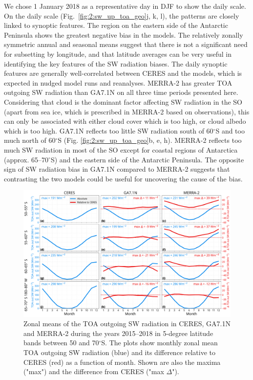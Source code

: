 We chose 1 January 2018 as a representative day in DJF to show the daily scale.
On the daily scale (Fig.~\ref{fig:2:sw_up_toa_geo}j, k, l), the patterns are
closely linked to synoptic features. The region on the eastern side of the
Antarctic Peninsula shows the greatest negative bias in the models. The
relatively zonally symmetric annual and seasonal means suggest that there is
not a significant need for subsetting by longitude, and that latitude averages
can be very useful in identifying the key features of the SW radiation biases.
The daily synoptic features are generally well-correlated between CERES and the
models, which is expected in nudged model runs and reanalyses. MERRA-2 has
greater TOA outgoing SW radiation than GA7.1N on all three time periods
presented here. Considering that cloud is the dominant factor affecting SW
radiation in the SO (apart from sea ice, which is prescribed in MERRA-2 based on observations), this can only be associated with either cloud cover which
is too high, or cloud albedo which is too high. GA7.1N reflects too little SW
radiation south of 60$^\circ$S and too much north of 60$^\circ$S (Fig.
\ref{fig:2:sw_up_toa_geo}b, e, h). MERRA-2 reflects too much SW radiation in most
of the SO except for coastal regions of Antarctica (approx. 65--70$^\circ$S)
and the eastern side of the Antarctic Peninsula. The opposite sign of SW
radiation bias in GA7.1N compared to MERRA-2 suggests that contrasting the two
models could be useful for uncovering the cause of the bias.

\begin{figure}[t]
\centering
\centerline{\includegraphics[width=1.12\textwidth]{chapter2/fig/sw_up_toa_time_rev1.pdf}}
\caption[Zonal means of the TOA outgoing SW radiation in CERES, GA7.1N and MERRA-2]{
Zonal means of the TOA outgoing SW radiation in CERES, GA7.1N and MERRA-2
during the years 2015--2018 in 5-degree latitude bands between 50 and
70$^\circ$S. The plots show monthly zonal mean TOA outgoing SW radiation
(blue) and its difference relative to CERES (red) as a function of month. Shown
are also the maxima ("max") and the difference from CERES ("max $\Delta$").
}
\label{fig:2:sw_up_toa_time}
\end{figure}

